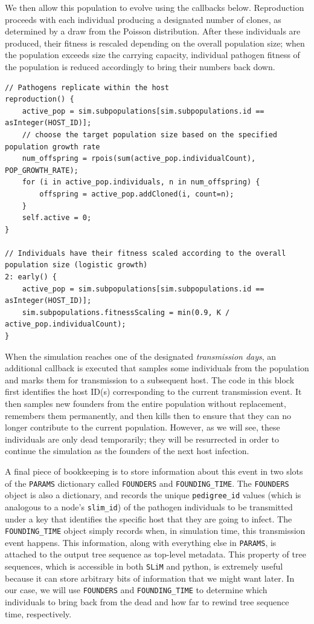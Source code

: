 \documentclass[12pt]{article}
\newcommand{\slim}[0]{\texttt{SLiM}\xspace}
\begin{document}
We then allow this population to evolve using the callbacks below. Reproduction proceeds with each individual producing a designated number of clones, as
determined by a draw from the Poisson distribution. After these individuals are produced, their fitness is rescaled depending on the overall population size; when
the population exceeds size the carrying capacity, individual pathogen fitness of the population is reduced accordingly to bring their numbers back down.

\begin{verbatim}
// Pathogens replicate within the host
reproduction() {
	active_pop = sim.subpopulations[sim.subpopulations.id == asInteger(HOST_ID)];
	// choose the target population size based on the specified population growth rate
	num_offspring = rpois(sum(active_pop.individualCount), POP_GROWTH_RATE);
	for (i in active_pop.individuals, n in num_offspring) {
		offspring = active_pop.addCloned(i, count=n);
	}
	self.active = 0;
}

// Individuals have their fitness scaled according to the overall population size (logistic growth)
2: early() {
	active_pop = sim.subpopulations[sim.subpopulations.id == asInteger(HOST_ID)];
	sim.subpopulations.fitnessScaling = min(0.9, K / active_pop.individualCount);
}
\end{verbatim}

When the simulation reaches one of the designated \textit{transmission days}, an additional callback is executed that samples some individuals from the
population and marks them for transmission to a subsequent host. The code in this block first identifies the host ID(s) corresponding to the current transmission event.
It then samples new founders from the entire population without replacement, remembers them permanently, and then kills then to ensure that they can no longer
contribute to the current population. However, as we will see, these individuals are only dead temporarily; they will be resurrected in order to
continue the simulation as the founders of the next host infection.

 A final piece of bookkeeping is to store information about this event in two slots of the \verb|PARAMS| dictionary
called \verb|FOUNDERS| and \verb|FOUNDING_TIME|. The \verb|FOUNDERS| object is also a dictionary, and records the unique \verb|pedigree_id| values (which is analogous to a node's \verb|slim_id|)
of the pathogen individuals to be transmitted under a key that identifies the specific host that they are going to infect. The \verb|FOUNDING_TIME| object simply records when, in
simulation time, this transmission event happens. This information, along with everything else in \verb|PARAMS|, is attached to the output tree sequence as top-level metadata. This property
of tree sequences, which is accessible in both \slim and python, is extremely useful because it can store arbitrary bits of information that we might want later. In our case,
we will use \verb|FOUNDERS| and \verb|FOUNDING_TIME| to determine which individuals to bring back from the dead and how far to rewind tree sequence time, respectively.
\end{document}
